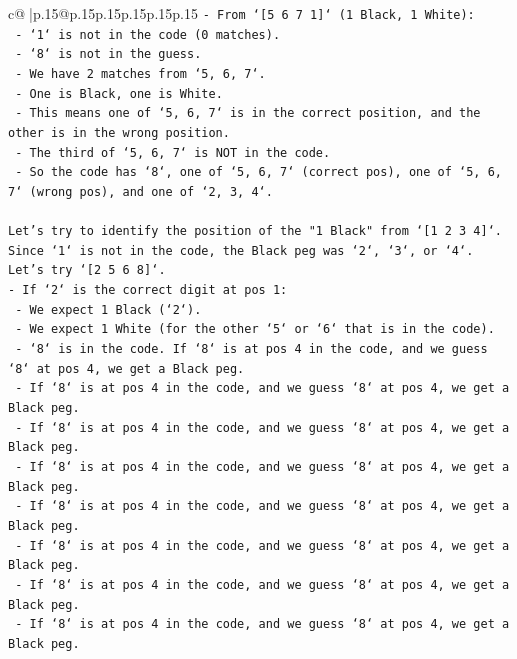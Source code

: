\documentclass{article}
\begin{document}
{\begin{supertabular}{c@{$\;$}|p{.15\linewidth}@{}p{.15\linewidth}p{.15\linewidth}p{.15\linewidth}p{.15\linewidth}p{.15\linewidth}}
{{{\texttt{{-} From `{[}5 6 7 1{]}` (1 Black, 1 White):} \\
\texttt{    {-} `1` is not in the code (0 matches).} \\
\texttt{    {-} `8` is not in the guess.} \\
\texttt{    {-} We have 2 matches from `5, 6, 7`.} \\
\texttt{    {-} One is Black, one is White.} \\
\texttt{    {-} This means one of `5, 6, 7` is in the correct position, and the other is in the wrong position.} \\
\texttt{    {-} The third of `5, 6, 7` is NOT in the code.} \\
\texttt{    {-} So the code has `8`, one of `5, 6, 7` (correct pos), one of `5, 6, 7` (wrong pos), and one of `2, 3, 4`.} \\
\\ 
\texttt{Let's try to identify the position of the "1 Black" from `{[}1 2 3 4{]}`.} \\
\texttt{Since `1` is not in the code, the Black peg was `2`, `3`, or `4`.} \\
\texttt{Let's try `{[}2 5 6 8{]}`.} \\
\texttt{{-} If `2` is the correct digit at pos 1:} \\
\texttt{    {-} We expect 1 Black (`2`).} \\
\texttt{    {-} We expect 1 White (for the other `5` or `6` that is in the code).} \\
\texttt{    {-} `8` is in the code. If `8` is at pos 4 in the code, and we guess `8` at pos 4, we get a Black peg.} \\
\texttt{    {-} If `8` is at pos 4 in the code, and we guess `8` at pos 4, we get a Black peg.} \\
\texttt{    {-} If `8` is at pos 4 in the code, and we guess `8` at pos 4, we get a Black peg.} \\
\texttt{    {-} If `8` is at pos 4 in the code, and we guess `8` at pos 4, we get a Black peg.} \\
\texttt{    {-} If `8` is at pos 4 in the code, and we guess `8` at pos 4, we get a Black peg.} \\
\texttt{    {-} If `8` is at pos 4 in the code, and we guess `8` at pos 4, we get a Black peg.} \\
\texttt{    {-} If `8` is at pos 4 in the code, and we guess `8` at pos 4, we get a Black peg.} \\
\texttt{    {-} If `8` is at pos 4 in the code, and we guess `8` at pos 4, we get a Black peg.} \\
}}}
\end{supertabular}}
\end{document}
